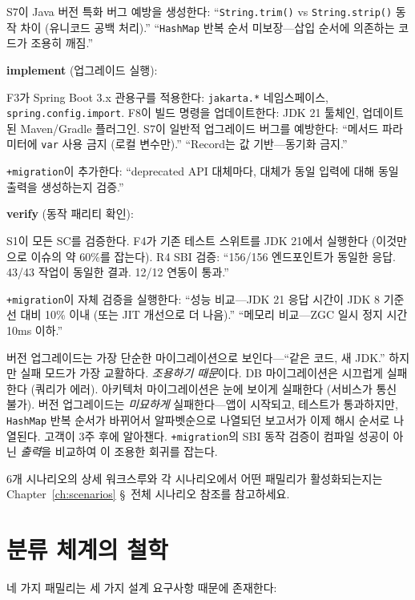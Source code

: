 \documentclass[11pt,a4paper,openright,twoside]{report}
\begin{document}
S7이 Java 버전 특화 버그 예방을 생성한다: ``\texttt{String.trim()} vs \texttt{String.strip()} 동작 차이 (유니코드 공백 처리).'' ``\texttt{HashMap} 반복 순서 미보장---삽입 순서에 의존하는 코드가 조용히 깨짐.''

\textbf{implement} (업그레이드 실행):

F3가 Spring Boot 3.x 관용구를 적용한다: \texttt{jakarta.*} 네임스페이스, \texttt{spring.config.import}. F8이 빌드 명령을 업데이트한다: JDK 21 툴체인, 업데이트된 Maven/Gradle 플러그인. S7이 일반적 업그레이드 버그를 예방한다: ``메서드 파라미터에 \texttt{var} 사용 금지 (로컬 변수만).'' ``Record는 값 기반---동기화 금지.''

\texttt{+migration}이 추가한다: ``deprecated API 대체마다, 대체가 동일 입력에 대해 동일 출력을 생성하는지 검증.''

\textbf{verify} (동작 패리티 확인):

S1이 모든 SC를 검증한다. F4가 기존 테스트 스위트를 JDK 21에서 실행한다 (이것만으로 이슈의 약 60\%를 잡는다). R4 SBI 검증: ``156/156 엔드포인트가 동일한 응답. 43/43 작업이 동일한 결과. 12/12 연동이 통과.''

\texttt{+migration}이 자체 검증을 실행한다: ``성능 비교---JDK 21 응답 시간이 JDK 8 기준선 대비 10\% 이내 (또는 JIT 개선으로 더 나음).'' ``메모리 비교---ZGC 일시 정지 시간 10ms 이하.''

\begin{warnbox}
버전 업그레이드는 가장 단순한 마이그레이션으로 보인다---``같은 코드, 새 JDK.'' 하지만 실패 모드가 가장 교활하다. \emph{조용하기 때문}이다. DB 마이그레이션은 시끄럽게 실패한다 (쿼리가 에러). 아키텍처 마이그레이션은 눈에 보이게 실패한다 (서비스가 통신 불가). 버전 업그레이드는 \emph{미묘하게} 실패한다---앱이 시작되고, 테스트가 통과하지만, \texttt{HashMap} 반복 순서가 바뀌어서 알파벳순으로 나열되던 보고서가 이제 해시 순서로 나열된다. 고객이 3주 후에 알아챈다. \texttt{+migration}의 SBI 동작 검증이 컴파일 성공이 아닌 \emph{출력}을 비교하여 이 조용한 회귀를 잡는다.
\end{warnbox}

6개 시나리오의 상세 워크스루와 각 시나리오에서 어떤 패밀리가 활성화되는지는 Chapter~\ref{ch:scenarios} \S~전체 시나리오 참조를 참고하세요.


\section{분류 체계의 철학}

네 가지 패밀리는 세 가지 설계 요구사항 때문에 존재한다:
\end{document}
